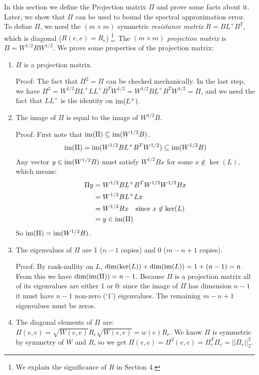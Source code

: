 \documentclass{article}
\begin{document}
In this section we define the Projection matrix $\Pi$ and prove some facts
about it. Later, we show that $\Pi$ can be used to bound the spectral
approximation error.  To define $\Pi$, we need the $(m \times m)$ symmetric
\textit{resistance matrix} $R = BL^+B^T$, which is diagonal ($R(e, e) =
R_e$) \footnote{We explain the significance of $R$ in Section 4.}.  The $(m
\times m)$ \textit{projection matrix} is $\Pi = W^{1/2}RW^{1/2}$. We prove
some properties of the projection matrix:
\begin{enumerate}[1.]
    \item $\Pi$ is a projection matrix.
        
        Proof: The fact that $\Pi^2 = \Pi$ can be checked mechanically. In
        the last step, we have $\Pi^2 = W^{1/2}BL^+LL^+B^TW^{1/2} =
        W^{1/2}BL^+B^TW^{1/2} = \Pi$, and we need the fact that $LL^+$ is
        the identity on $\text{im}(L^+)$.

    \item The image of $\Pi$ is equal to the image of $W^{1/2}B$.
        
        Proof: First note that $\text{im}(\Pi) \subseteq \text{im}(W^{1/2}B)$.
        \begin{align*}
            \text{im}(\Pi) = \text{im}(W^{1/2}BL^+B^TW^{1/2}) \subseteq \text{im}(W^{1/2}B)
        \end{align*}
        Any vector $y \in \text{im}(W^{1/2}B)$ must satisfy $W^{1/2}Bx$ for some
        $x \not\in \ker(L)$, which means:
        \begin{align*}
            \Pi y &= W^{1/2}BL^+B^TW^{1/2}W^{1/2}Bx \\
                  &= W^{1/2}BL^+Lx \\
                  &= W^{1/2}Bx \quad \text{since } x \not\in \ker(L) \\
                  &= y \in \text{im}(\Pi)
        \end{align*}
        So $\text{im}(\Pi) = \text{im}(W^{1/2}B)$.

    \item The eigenvalues of $\Pi$ are 1 ($n-1$ copies) and 0 ($m-n+1$
        copies).

        Proof: By rank-nullity on $L$, $\dim(\ker(L)) + \dim(\text{im}(L)) = 1 +
        (n-1) = n$. From this we have $\dim(\text{im}(\Pi)) = n-1$. Because $\Pi$
        is a projection matrix all of its eigenvalues are either 1 or 0:
        since the image of $\Pi$ has dimension $n-1$ it must have $n-1$
        non-zero (`1') eigenvalues. The remaining $m-n+1$ eigenvalues must
        be zeros.

    \item The diagonal elements of $\Pi$ are: $\Pi(e, e) = \sqrt{W(e,
        e)}R_e\sqrt{W(e, e)} = w(e)R_e$. We know $\Pi$ is symmetric by
        symmetry of $W$ and $R$, so we get $\Pi(e, e) = \Pi^2(e, e) =
        \Pi_e^T\Pi_e = ||\Pi_e||^2_2$.
\end{enumerate}
\end{document}
